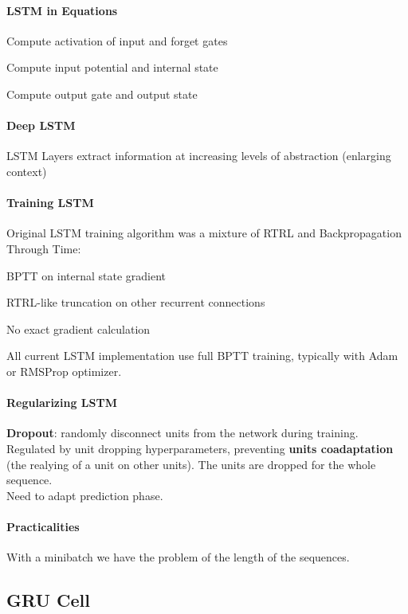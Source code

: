 \documentclass[10pt]{report}
\begin{document}
\paragraph{LSTM in Equations} %
\begin{list}{}{}
	\item Compute activation of input and forget gates
	\item Compute input potential and internal state
	\item Compute output gate and output state
\end{list}
\paragraph{Deep LSTM} LSTM Layers extract information at increasing levels of abstraction (enlarging context)
\paragraph{Training LSTM} Original LSTM training algorithm was a mixture of RTRL and Backpropagation Through Time:
\begin{list}{}{}
	\item BPTT on internal state gradient
	\item RTRL-like truncation on other recurrent connections
	\item No exact gradient calculation
\end{list}
All current LSTM implementation use full BPTT training, typically with Adam or RMSProp optimizer.
\paragraph{Regularizing LSTM}\begin{list}{}{}
	\item \textbf{Dropout}: randomly disconnect units from the network during training. Regulated by unit dropping hyperparameters, preventing \textbf{units coadaptation} (the realying of a unit on other units). The units are dropped for the whole sequence.\\Need to adapt prediction phase.
	
\end{list}
\paragraph{Practicalities} With a minibatch we have the problem of the length of the sequences.
\subsection{GRU Cell}
\end{document}
